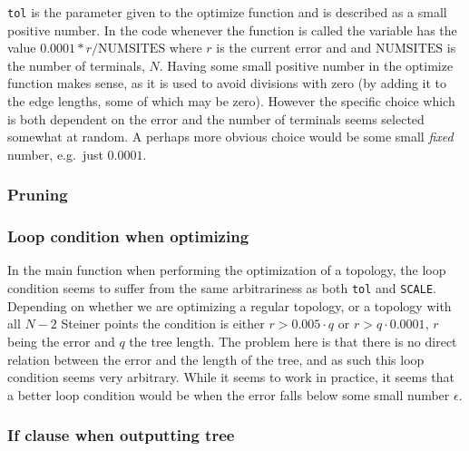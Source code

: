 \texttt{tol} is the parameter given to the optimize function and is described as
a small positive number.  In the code whenever the function is called the
variable has the value $0.0001*r/\text{NUMSITES}$ where $r$ is the current
error and and $\text{NUMSITES}$ is the number of terminals, $N$.  Having some
small positive number in the optimize function makes sense, as it is used to
avoid divisions with zero (by adding it to the edge lengths, some of which may
be zero).  However the specific choice which is both dependent on the error and
the number of terminals seems selected somewhat at random.  A perhaps more
obvious choice would be some small \textit{fixed} number, e.g.\ just $0.0001$.


\subsubsection{Pruning}
\label{sec:pruning}


\subsubsection{Loop condition when optimizing}
\label{sec:loop-condition-when-1}

In the main function when performing the optimization of a topology, the loop
condition seems to suffer from the same arbitrariness as both \texttt{tol} and
\texttt{SCALE}.  Depending on whether we are optimizing a regular topology, or a
topology with all $N-2$ Steiner points the condition is either $r > 0.005 \cdot
q$ or $r > q \cdot 0.0001$, $r$ being the error and $q$ the tree length.  The
problem here is that there is no direct relation between the error and the
length of the tree, and as such this loop condition seems very arbitrary.  While
it seems to work in practice, it seems that a better loop condition would be
when the error falls below some small number $\epsilon$.


\subsubsection{If clause when outputting tree}
\label{sec:if-clause-when}

